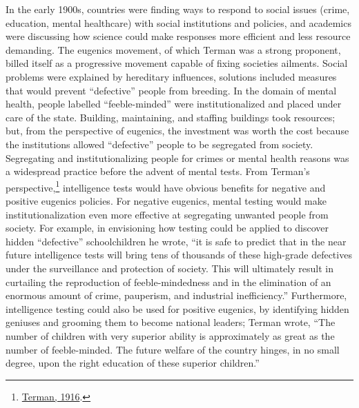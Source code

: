 \documentclass[
  oneside,
  12pt]{crumpbook}
\begin{document}
In the early 1900s, countries were finding ways to respond to social issues (crime, education, mental healthcare) with social institutions and policies, and academics were discussing how science could make responses more efficient and less resource demanding. The eugenics movement, of which Terman was a strong proponent, billed itself as a progressive movement capable of fixing societies ailments. Social problems were explained by hereditary influences, solutions included measures that would prevent ``defective'' people from breeding. In the domain of mental health, people labelled ``feeble-minded'' were institutionalized and placed under care of the state. Building, maintaining, and staffing buildings took resources; but, from the perspective of eugenics, the investment was worth the cost because the institutions allowed ``defective'' people to be segregated from society. Segregating and institutionalizing people for crimes or mental health reasons was a widespread practice before the advent of mental tests. From Terman's perspective,\footnote{\protect\hyperlink{ref-termanMeasurementIntelligenceExplanation1916}{Terman, 1916}.} intelligence tests would have obvious benefits for negative and positive eugenics policies. For negative eugenics, mental testing would make institutionalization even more effective at segregating unwanted people from society. For example, in envisioning how testing could be applied to discover hidden ``defective'' schoolchildren he wrote, ``it is safe to predict that in the near future intelligence tests will bring tens of thousands of these high-grade defectives under the surveillance and protection of society. This will ultimately result in curtailing the reproduction of feeble-mindedness and in the elimination of an enormous amount of crime, pauperism, and industrial inefficiency.'' Furthermore, intelligence testing could also be used for positive eugenics, by identifying hidden geniuses and grooming them to become national leaders; Terman wrote, ``The number of children with very superior ability is approximately as great as the number of feeble-minded. The future welfare of the country hinges, in no small degree, upon the right education of these superior children.''
\end{document}
